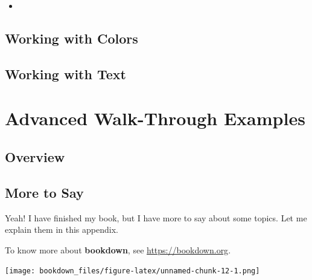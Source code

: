 \documentclass[
]{krantz}
\providecommand{\tightlist}{%
  \setlength{\itemsep}{0pt}\setlength{\parskip}{0pt}}
\begin{document}
\begin{itemize}
\tightlist
\item
\end{itemize}

\hypertarget{working-with-colors}{%
\chapter{Working with Colors}\label{working-with-colors}}

\hypertarget{working-with-text}{%
\chapter{Working with Text}\label{working-with-text}}

\hypertarget{part-advanced-walk-through-examples}{%
\part{Advanced Walk-Through Examples}\label{part-advanced-walk-through-examples}}

\hypertarget{advanced-examples}{%
\chapter{Overview}\label{advanced-examples}}

\cleardoublepage

\hypertarget{appendix-appendix}{%
\appendix {}}


\hypertarget{more-to-say}{%
\chapter{More to Say}\label{more-to-say}}

Yeah! I have finished my book, but I have more to say about some topics. Let me explain them in this appendix.

To know more about \textbf{bookdown}, see \url{https://bookdown.org}.

\texttt{[image: bookdown\_files/figure-latex/unnamed-chunk-12-1.png]}

  

\backmatter
\printindex
\end{document}
